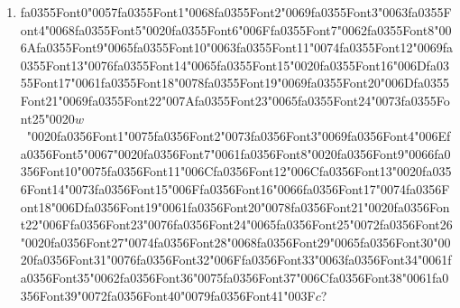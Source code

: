 \documentclass[12pt]{article}
\begin{document}
\begin{enumerate}[label=Q\arabic*.]
 \item {\csname fa0355Font0\endcsname\char"0057}{\csname fa0355Font1\endcsname\char"0068}{\csname fa0355Font2\endcsname\char"0069}{\csname fa0355Font3\endcsname\char"0063}{\csname fa0355Font4\endcsname\char"0068}{\csname fa0355Font5\endcsname\char"0020}{\csname fa0355Font6\endcsname\char"006F}{\csname fa0355Font7\endcsname\char"0062}{\csname fa0355Font8\endcsname\char"006A}{\csname fa0355Font9\endcsname\char"0065}{\csname fa0355Font10\endcsname\char"0063}{\csname fa0355Font11\endcsname\char"0074}{\csname fa0355Font12\endcsname\char"0069}{\csname fa0355Font13\endcsname\char"0076}{\csname fa0355Font14\endcsname\char"0065}{\csname fa0355Font15\endcsname\char"0020}{\csname fa0355Font16\endcsname\char"006D}{\csname fa0355Font17\endcsname\char"0061}{\csname fa0355Font18\endcsname\char"0078}{\csname fa0355Font19\endcsname\char"0069}{\csname fa0355Font20\endcsname\char"006D}{\csname fa0355Font21\endcsname\char"0069}{\csname fa0355Font22\endcsname\char"007A}{\csname fa0355Font23\endcsname\char"0065}{\csname fa0355Font24\endcsname\char"0073}{\csname fa0355Font25\endcsname\char"0020}$w$\ {\char"0020}{\csname fa0356Font1\endcsname\char"0075}{\csname fa0356Font2\endcsname\char"0073}{\csname fa0356Font3\endcsname\char"0069}{\csname fa0356Font4\endcsname\char"006E}{\csname fa0356Font5\endcsname\char"0067}{\char"0020}{\csname fa0356Font7\endcsname\char"0061}{\csname fa0356Font8\endcsname\char"0020}{\csname fa0356Font9\endcsname\char"0066}{\csname fa0356Font10\endcsname\char"0075}{\csname fa0356Font11\endcsname\char"006C}{\csname fa0356Font12\endcsname\char"006C}{\csname fa0356Font13\endcsname\char"0020}{\csname fa0356Font14\endcsname\char"0073}{\csname fa0356Font15\endcsname\char"006F}{\csname fa0356Font16\endcsname\char"0066}{\csname fa0356Font17\endcsname\char"0074}{\csname fa0356Font18\endcsname\char"006D}{\csname fa0356Font19\endcsname\char"0061}{\csname fa0356Font20\endcsname\char"0078}{\csname fa0356Font21\endcsname\char"0020}{\csname fa0356Font22\endcsname\char"006F}{\csname fa0356Font23\endcsname\char"0076}{\csname fa0356Font24\endcsname\char"0065}{\csname fa0356Font25\endcsname\char"0072}{\csname fa0356Font26\endcsname\char"0020}{\csname fa0356Font27\endcsname\char"0074}{\csname fa0356Font28\endcsname\char"0068}{\csname fa0356Font29\endcsname\char"0065}{\csname fa0356Font30\endcsname\char"0020}{\csname fa0356Font31\endcsname\char"0076}{\csname fa0356Font32\endcsname\char"006F}{\csname fa0356Font33\endcsname\char"0063}{\csname fa0356Font34\endcsname\char"0061}{\csname fa0356Font35\endcsname\char"0062}{\csname fa0356Font36\endcsname\char"0075}{\csname fa0356Font37\endcsname\char"006C}{\csname fa0356Font38\endcsname\char"0061}{\csname fa0356Font39\endcsname\char"0072}{\csname fa0356Font40\endcsname\char"0079}{\csname fa0356Font41\endcsname\char"003F}$c$?

\end{enumerate}
\end{document}
